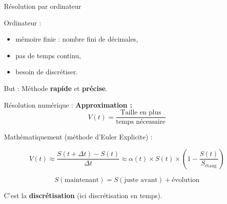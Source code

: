 \documentclass[11pt]{beamer}
\begin{document}
\begin{frame}
\begin{block}{}
Résolution par ordinateur
\end{block}

\begin{block}{Ordinateur :}
\begin{itemize}
\item mémoire finie : nombre fini de décimales,

\item pas de temps continu,

\item besoin de discrétiser.

\end{itemize}
\end{block}

\begin{block}{But :}
Méthode \textbf{rapide} et \textbf{précise}.

\end{block}

\end{frame}



\begin{frame}{Résolution numérique :}
\textbf{Approximation :}
$$V(t) = \dfrac{\text{Taille en plus}}{\text{temps nécessaire}}$$

Mathématiquement (méthode d'Euler Explicite) :

$$V(t) \approx \dfrac{S(t+\Delta t)-S(t)}{\Delta t} \approx \alpha(t) \times S(t) \times \left( 1 - \dfrac{S(t)}{S_{\text{étang}}} \right)$$

\end{frame}

\begin{frame}

$$S(\text{maintenant}) = S(\text{juste avant}) + \text{évolution}$$

\begin{center}
\end{center}

C'est la \textbf{discrétisation} (ici discrétisation en temps).

\end{frame}
\end{document}
